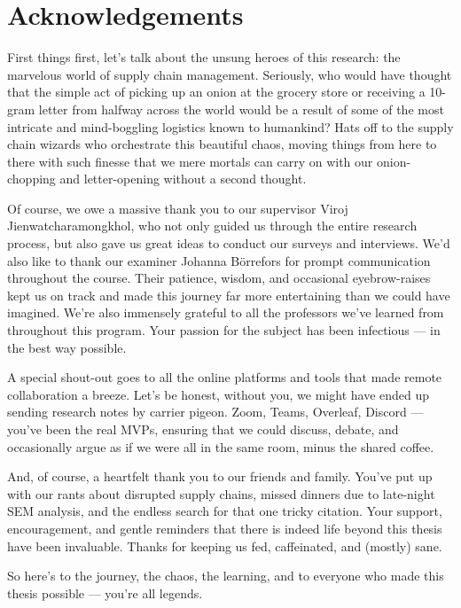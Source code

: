 \thispagestyle{plain}			%
\section*{Acknowledgements}

First things first, let’s talk about the unsung heroes of this research: the marvelous world of supply chain management. Seriously, who would have thought that the simple act of picking up an onion at the grocery store or receiving a 10-gram letter from halfway across the world would be a result of some of the most intricate and mind-boggling logistics known to humankind? Hats off to the supply chain wizards who orchestrate this beautiful chaos, moving things from here to there with such finesse that we mere mortals can carry on with our onion-chopping and letter-opening without a second thought. 

Of course, we owe a massive thank you to our supervisor Viroj Jienwatcharamongkhol, who not only guided us through the entire research process, but also gave us great ideas to conduct our surveys and interviews. We'd also like to thank our examiner Johanna Börrefors for prompt communication throughout the course. Their patience, wisdom, and occasional eyebrow-raises kept us on track and made this journey far more entertaining than we could have imagined. We’re also immensely grateful to all the professors we’ve learned from throughout this program. Your passion for the subject has been infectious — in the best way possible.

A special shout-out goes to all the online platforms and tools that made remote collaboration a breeze. Let’s be honest, without you, we might have ended up sending research notes by carrier pigeon. Zoom, Teams, Overleaf, Discord — you’ve been the real MVPs, ensuring that we could discuss, debate, and occasionally argue as if we were all in the same room, minus the shared coffee.

And, of course, a heartfelt thank you to our friends and family. You’ve put up with our rants about disrupted supply chains, missed dinners due to late-night SEM analysis, and the endless search for that one tricky citation. Your support, encouragement, and gentle reminders that there is indeed life beyond this thesis have been invaluable. Thanks for keeping us fed, caffeinated, and (mostly) sane.

So here’s to the journey, the chaos, the learning, and to everyone who made this thesis possible — you’re all legends.


\vspace{1.5cm}
\hfill

\authorm \\
\authorp \\
\authort

\thispagestyle{empty}
\mbox{}